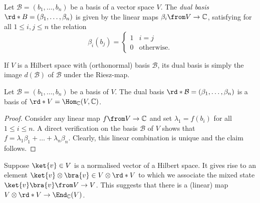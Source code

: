 \documentclass[a4paper,oneside, 12pt]{amsart}
\begin{document}
\begin{definition}\label{def:dual-basis}
  Let \(\mathcal{B} = (b_{1}, \dots , b_{n})\) be a basis of a vector space \(V\).
  The \emph{dual basis} \(\rd*{B}= (\beta_{1}, \dots , \beta_{n})\) is given by the linear maps \( \beta_{i} \from V \to \mathbb{C}\), satisfying for all \(1\leq i,j \leq n\) the relation
  \begin{equation*}
    \beta_{i}(b_{j})=
    \begin{cases}
      1 & i=j \\
      0 & \text{otherwise.}
    \end{cases}
  \end{equation*}
\end{definition}

If \(V\) is a Hilbert space with (orthonormal) basis \(\mathcal{B}\), its dual basis is simply the image \(d( \mathcal{B})\) of \(\mathcal{B}\) under the Riesz-map.

\begin{lemma}\label{lem:dual-basis-is-basis}
  Let \(\mathcal{B}= (b_{1}, \dots , b_{n})\) be a basis of \(V\).
  The dual basis \(\rd*{\mathcal{B}}= (\beta_{1}, \dots , \beta_{n})\) is a basis of \(\rd*{V}= \Hom_{ \mathbb{C}}(V, \mathbb{C})\).
\end{lemma}
\begin{proof}
  Consider any linear map \(f \from V\to \mathbb{C}\) and set \(\lambda_{1} = f(b_{i})\) for all \(1\leq i\leq n\).
  A direct verification on the basis \(\mathcal{B}\) of \(V\) shows that \(f=\lambda_{1} \beta_{1} + \dots + \lambda_{n}\beta_{n}\).
  Clearly, this linear combination is unique and the claim follows.
\end{proof}

Suppose \(\ket{v} \in V\) is a normalised vector  of a Hilbert space.
It gives  rise to an element \(\ket{v} \otimes \bra{v} \in V \otimes \rd*{V}\) to which we associate the mixed state \(\ket{v}\bra{v} \from V\to V\).
This suggests that there is a (linear) map \(V \otimes \rd*{V} \to \End_{ \mathbb{C}}(V)\).
\end{document}
